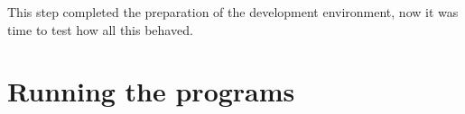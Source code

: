 This step completed the preparation of the development environment, now it was time to test how all this behaved.



\section{Running the programs}

%
%
%
